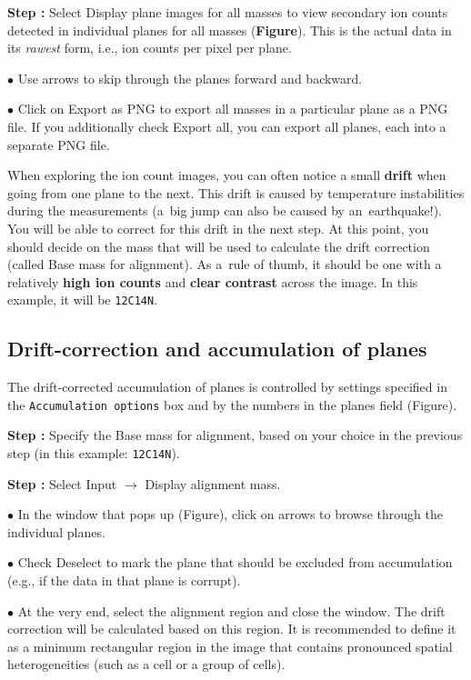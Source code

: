 \documentclass[a4paper, 11pt]{article}
\newcommand{\ttt}[1]{\texttt{#1}}
\newcommand{\lans}[1]{{\color{magenta}#1}}
\newcommand{\lanscb}[1]{{\color{darkgreen}#1}}
\newcommand{\lanstf}[1]{{\color{cyan}#1}}
\newcommand\ra{\rightarrow}
\newcommand\figref[0]{\textbf{Figure}}
\newcounter{step}
\newcommand\s{\addtocounter{step}{1}\noindent\textbf{Step \thestep:}{ }}
\newcommand\bul{\noindent$\bullet${ }}
\newcommand\bb[1]{\textbf{#1}}
\begin{document}
\s Select \lans{Display plane images for all masses} to view secondary ion counts detected in individual planes for all masses (\figref). This is the actual data in its \emph{rawest} form, i.e., ion counts per pixel per plane.

\bul Use arrows to skip through the planes forward and backward.

\bul Click on \lans{Export as PNG} to export all masses in a particular plane as a PNG file. If you additionally check \lanscb{Export all}, you can export all planes, each into a separate PNG file.

When exploring the ion count images, you can often notice a small \bb{drift} when going from one plane to the next. This drift is caused by temperature instabilities during the measurements (a~big jump can also be caused by an~earthquake!). You will be able to correct for this drift in the next step. At this point, you should decide on the mass that will be used to calculate the drift correction (called \lanstf{Base mass for alignment}). As a~rule of thumb, it should be one with a relatively \bb{high ion counts} and \bb{clear contrast} across the image. In this example, it will be \ttt{12C14N}.


\subsection{Drift-correction and accumulation of planes}
\setcounter{step}{0}

The drift-corrected accumulation of planes is controlled by settings specified in the \ttt{Accumulation options} box and by the numbers in the \lanstf{planes} field (Figure). 

\s Specify the \lanstf{Base mass for alignment}, based on your choice in the previous step (in this example: \ttt{12C14N}). 

\s Select \lans{Input} $\ra$ \lans{Display alignment mass}. 

\bul In the window that pops up (Figure), click on \lans{arrows} to browse through the individual planes. 

\bul Check \lanscb{Deselect} to mark the plane that should be excluded from accumulation (e.g., if the data in that plane is corrupt).

\bul At the very end, select the \lans{alignment region} and close the window. The drift correction will be calculated based on this region. It is recommended to define it as a minimum rectangular region in the image that contains pronounced spatial heterogeneities (such as a cell or a group of cells).
\end{document}
